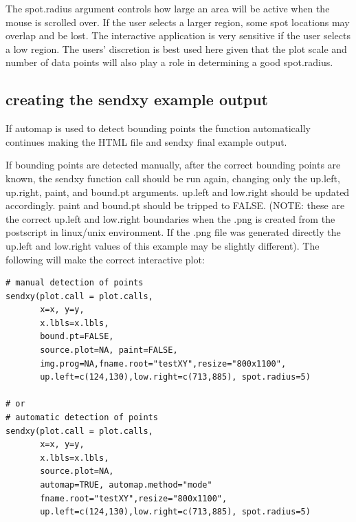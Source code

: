 \documentclass[]{article}
\begin{document}
\indent The spot.radius argument controls how large an area will be active when the mouse is scrolled over. If the user selects a larger region, some spot locations may overlap and be lost. The interactive application is very sensitive if the user selects a low region. The users' discretion is best used here given that the plot scale and number of data points will also play a role in determining a good spot.radius.  \\

\subsection{creating the sendxy example output}

\indent If automap is used to detect bounding points the function automatically continues making the HTML file and sendxy final example output. 

\indent If bounding points are detected manually, after the correct bounding points are known, the sendxy function call should be run again, changing only the up.left, up.right, paint, and bound.pt arguments. up.left and low.right should be updated accordingly. paint and bound.pt should be tripped to FALSE. (NOTE: these are the correct up.left and low.right boundaries when the .png is created from the postscript in linux/unix environment. If the .png file was generated directly the up.left and low.right values of this example may be slightly different).  The following will make the correct interactive plot:
\begin{verbatim}
# manual detection of points  
sendxy(plot.call = plot.calls, 
       x=x, y=y,
       x.lbls=x.lbls,  
       bound.pt=FALSE, 
       source.plot=NA, paint=FALSE,
       img.prog=NA,fname.root="testXY",resize="800x1100", 
       up.left=c(124,130),low.right=c(713,885), spot.radius=5)

# or 
# automatic detection of points
sendxy(plot.call = plot.calls, 
       x=x, y=y,
       x.lbls=x.lbls,  
       source.plot=NA, 
       automap=TRUE, automap.method="mode"
       fname.root="testXY",resize="800x1100", 
       up.left=c(124,130),low.right=c(713,885), spot.radius=5)
\end{verbatim}
\end{document}
